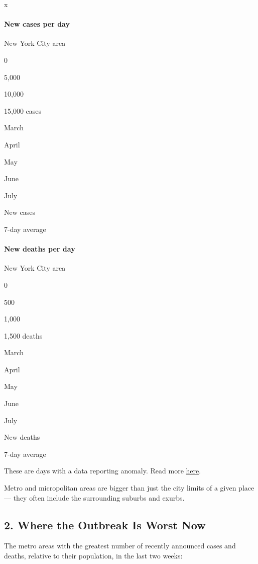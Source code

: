 x

\hypertarget{new-cases-per-day-1}{%
\paragraph{New cases per day}\label{new-cases-per-day-1}}

New York City area

0

5,000

10,000

15,000 cases

March

April

May

June

July

New cases

7-day average

\hypertarget{new-deaths-per-day-1}{%
\paragraph{New deaths per day}\label{new-deaths-per-day-1}}

New York City area

0

500

1,000

1,500 deaths

March

April

May

June

July

New deaths

7-day average

These are days with a data reporting anomaly. Read more
\protect\hyperlink{anomaly-notes}{here}.

Metro and micropolitan areas are bigger than just the city limits of a
given place --- they often include the surrounding suburbs and exurbs.

\hypertarget{2-where-the-outbreak-is-worst-now}{%
\subsection{2. Where the Outbreak Is Worst
Now}\label{2-where-the-outbreak-is-worst-now}}

The metro areas with the greatest number of recently announced cases and
deaths, relative to their population, in the last two weeks:

